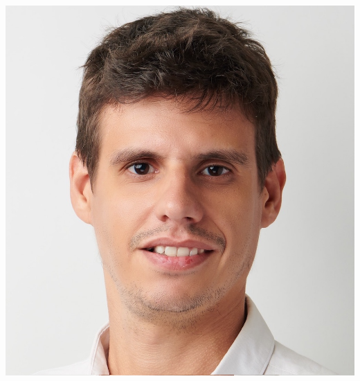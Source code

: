 \documentclass[paper=a4,fontsize=11pt]{temp} %
\begin{document}
\begin{minipage}{.21\linewidth}
   \includegraphics[width=1.05\textwidth]{PicQuim2019}
   \vspace{2pt}
\end{minipage}      
\end{document}
